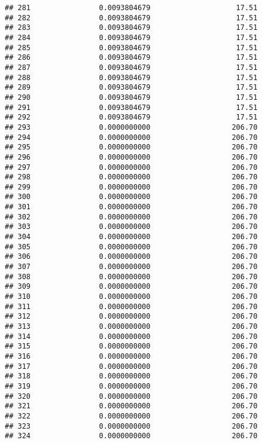 \documentclass[]{article}
\begin{document}
\begin{verbatim}
## 281                0.0093804679                    17.51
## 282                0.0093804679                    17.51
## 283                0.0093804679                    17.51
## 284                0.0093804679                    17.51
## 285                0.0093804679                    17.51
## 286                0.0093804679                    17.51
## 287                0.0093804679                    17.51
## 288                0.0093804679                    17.51
## 289                0.0093804679                    17.51
## 290                0.0093804679                    17.51
## 291                0.0093804679                    17.51
## 292                0.0093804679                    17.51
## 293                0.0000000000                   206.70
## 294                0.0000000000                   206.70
## 295                0.0000000000                   206.70
## 296                0.0000000000                   206.70
## 297                0.0000000000                   206.70
## 298                0.0000000000                   206.70
## 299                0.0000000000                   206.70
## 300                0.0000000000                   206.70
## 301                0.0000000000                   206.70
## 302                0.0000000000                   206.70
## 303                0.0000000000                   206.70
## 304                0.0000000000                   206.70
## 305                0.0000000000                   206.70
## 306                0.0000000000                   206.70
## 307                0.0000000000                   206.70
## 308                0.0000000000                   206.70
## 309                0.0000000000                   206.70
## 310                0.0000000000                   206.70
## 311                0.0000000000                   206.70
## 312                0.0000000000                   206.70
## 313                0.0000000000                   206.70
## 314                0.0000000000                   206.70
## 315                0.0000000000                   206.70
## 316                0.0000000000                   206.70
## 317                0.0000000000                   206.70
## 318                0.0000000000                   206.70
## 319                0.0000000000                   206.70
## 320                0.0000000000                   206.70
## 321                0.0000000000                   206.70
## 322                0.0000000000                   206.70
## 323                0.0000000000                   206.70
## 324                0.0000000000                   206.70

\end{verbatim}
\end{document}
